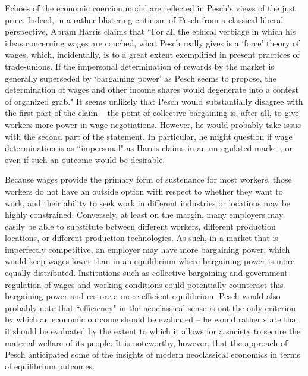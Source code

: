 \documentclass{article}
\begin{document}
Echoes of the economic coercion model are reflected in Pesch’s views of the just price.  Indeed, in a rather blistering criticism of Pesch from a classical liberal perspective, Abram Harris claims that ``For all the ethical verbiage in which his ideas concerning wages are couched, what Pesch really gives is a ‘force’ theory of wages, which, incidentally, is to a great extent exemplified in present practices of trade-unions.  If the impersonal determination of rewards by the market is generally superseded by ‘bargaining power’ as Pesch seems to propose, the determination of wages and other income shares would degenerate into a contest of organized grab." \citep[pp. 46-47]{harris1946}  It seems unlikely that Pesch would substantially disagree with the first part of the claim – the point of collective bargaining is, after all, to give workers more power in wage negotiations.  However, he would probably take issue with the second part of the statement.  In particular, he might question if wage determination is as ``impersonal" as Harris claims in an unregulated market, or even if such an outcome would be desirable.\medskip

Because wages provide the primary form of sustenance for most workers, those workers do not have an outside option with respect to whether they want to work, and their ability to seek work in different industries or locations may be highly constrained.  Conversely, at least on the margin, many employers may easily be able to substitute between different workers, different production locations, or different production technologies.  As such, in a market that is imperfectly competitive, an employer may have more bargaining power, which would keep wages lower than in an equilibrium where bargaining power is more equally distributed.  Institutions such as collective bargaining and government regulation of wages and working conditions could potentially counteract this bargaining power and restore a more efficient equilibrium.  Pesch would also probably note that ``efficiency" in the neoclassical sense is not the only criterion by which an economic outcome should be evaluated – he would rather state that it should be evaluated by the extent to which it allows for a society to secure the material welfare of its people.  It is noteworthy, however, that the approach of Pesch anticipated some of the insights of modern neoclassical economics in terms of equilibrium outcomes.\medskip
\end{document}
